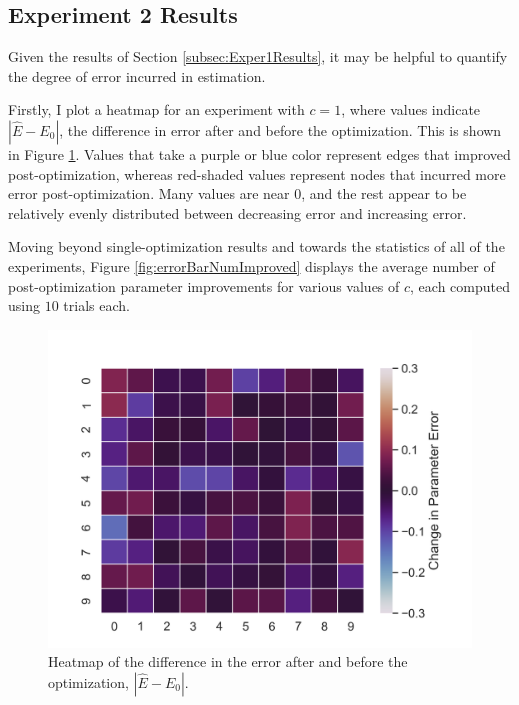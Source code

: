 \documentclass[12pt]{article}
\theoremstyle{definition}
\begin{document}
\subsection{Experiment 2 Results}
\label{subsec:Exper2Results}

Given the results of Section \ref{subsec:Exper1Results}, it may be helpful to quantify the degree of error incurred in estimation.

Firstly, I plot a heatmap for an experiment with $c=1$, where values indicate $|\hat{E} - E_0|$, the difference in error after and before the optimization. This is shown in Figure \ref{fig:heatmapImprovements}. Values that take a purple or blue color represent edges that improved post-optimization, whereas red-shaded values represent nodes that incurred more error post-optimization. Many values are near $0$, and the rest appear to be relatively evenly distributed between decreasing error and increasing error.

Moving beyond single-optimization results and towards the statistics of all of the experiments, Figure \ref{fig:errorBarNumImproved} displays the average number of post-optimization parameter improvements for various values of $c$, each computed using $10$ trials each.

\begin{figure}[hbt!]
    \par
    \begin{center}
    \caption{Heatmap of the difference in the error after and before the optimization, $|\hat{E} - E_0|$.}
    \label{fig:heatmapImprovements}
    \includegraphics[scale=0.85]{Figures/heatmap_improved_params.png}
    \end{center}
    \par
    \vspace{-0.25in}
    \medskip
\end{figure}
\end{document}
